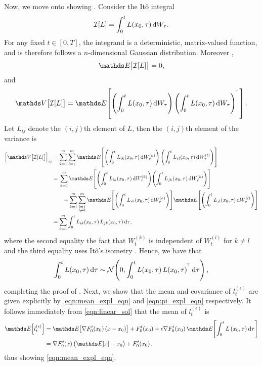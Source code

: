 Now, we move onto showing .
Consider the It\^o integral
\[
	\mathcal{I}[L] = \int_0^t{L\!\left(x_0, \tau\right)\dif W_\tau}.
\]
For any fixed \(t \in [0,T]\), the integrand is a deterministic, matrix-valued function, and is therefore follows a \(n\)-dimensional Gaussian distribution.
Moreover \citep{KallianpurSundar_2014_StochasticAnalysisDiffusion},
\[
	\avg{\mathcal{I}[L]} = 0,
\]
and
\[
	\var{\mathcal{I}[L]} = \avg{\left(\int_0^t{L\!\left(x_0, \tau\right)\dif W_\tau}\right)\left(\int_0^t{L\!\left(x_0, \tau\right)\dif W_\tau}\right)^{\T}}.
\]
Let \(L_{ij}\) denote the \((i,j)\)th element of \(L\), then the \((i,j)\)th element of the variance is
\begin{align*}
	\left[\var{\mathcal{I}[L]}\right]_{ij} %
	 & = \sum_{k=1}^{m}\sum_{l=1}^m\avg{\left(\int_0^t{L_{ik}\!\left(x_0, \tau\right)\dif W_{\tau}^{(k)}}\right)\left(\int_0^t{L_{jl}\!\left(x_0, \tau\right)\dif W_{\tau}^{(l)}}\right)} \\
	 & = \begin{multlined}[t]
		     \sum_{k=1}^{m}\avg{\left(\int_0^t{L_{ik}\!\left(x_0, \tau\right)\dif W_{\tau}^{(k)}}\right)\!\left(\int_0^t{L_{jk}\!\left(x_0, \tau\right)\dif W_{\tau}^{(k)}}\right)} \\
		     \!\!+ \sum_{k=1}^{m}\sum_{\substack{l=1 \\ l \neq k}}^m\avg{\left(\int_0^t{L_{ik}\!\left(x_0, \tau\right)\dif W_{\tau}^{(k)}}\right)}\!\avg{\left(\int_0^t{L_{jl}\!\left(x_0, \tau\right)\dif W_{\tau}^{(l)}}\right)}
	     \end{multlined}                                                                  \\
	 & = \sum_{k=1}^m{\int_0^t{L_{ik}\!\left(x_0, \tau\right)L_{jk}\!\left(x_0, \tau\right)\dif\tau}},
\end{align*}
where the second equality  the fact that \(W_t^{(k)}\) is independent of \(W_t^{(l)}\) for \(k \neq l\) and the third equality uses It\^o's isometry \citep{KallianpurSundar_2014_StochasticAnalysisDiffusion}.
Hence, we have that
\[
	\int_0^t{L\!\left(x_0, \tau\right)\dif\tau} \isGauss{0, \int_0^t{L\!\left(x_0, \tau\right)L\!\left(x_0, \tau\right)^{\T}}\dif\tau},
\]
completing the proof of .
Next, we show that the mean and covariance of \(l_t^{(\epsilon)}\) are given explicitly by \cref{eqn:mean_expl_eqn} and \cref{eqn:pi_expl_eqn} respectively.
It follows immediately from \cref{eqn:linear_sol} that the mean of \(l_t^{(\epsilon)}\) is
\begin{align*}
	\avg{l_t^{(\epsilon)}} & = \avg{\nabla F_0^t\!\left(x_0\right) \left(x - x_0\right)} + F_0^t\!\left(x_0\right) + \epsilon \nabla F_0^t\!\left(x_0\right)\avg{\int_0^t{L\left(x_0,\tau\right)\dif\tau}} \\
	                       & = \nabla F_0^t(x) \left(\avg{x} - x_0\right) + F_0^t\!\left(x_0\right),
\end{align*}
thus showing \cref{eqn:mean_expl_eqn}.

